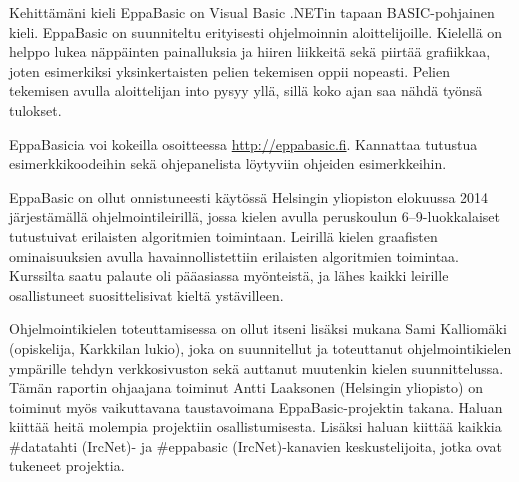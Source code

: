 Kehittämäni kieli EppaBasic
on Visual Basic .NETin tapaan
BASIC-pohjainen kieli.
EppaBasic on suunniteltu
erityisesti ohjelmoinnin aloittelijoille.
Kielellä on helppo lukea
näppäinten painalluksia
ja hiiren liikkeitä
sekä piirtää grafiikkaa,
joten esimerkiksi yksinkertaisten
pelien tekemisen oppii nopeasti.
Pelien tekemisen avulla aloittelijan into pysyy yllä,
sillä koko ajan saa nähdä työnsä tulokset.

EppaBasicia voi kokeilla osoitteessa
\url{http://eppabasic.fi}.
Kannattaa tutustua esimerkkikoodeihin
sekä ohjepanelista löytyviin
ohjeiden esimerkkeihin.

EppaBasic on ollut onnistuneesti käytössä
Helsingin yliopiston elokuussa 2014
järjestämällä ohjelmointileirillä,
jossa kielen avulla peruskoulun
6--9-luokkalaiset
tutustuivat erilaisten algoritmien toimintaan.
Leirillä kielen graafisten ominaisuuksien
avulla havainnollistettiin erilaisten
algoritmien toimintaa.
Kurssilta saatu palaute oli pääasiassa myönteistä,
ja lähes kaikki leirille osallistuneet
suosittelisivat kieltä ystävilleen.

Ohjelmointikielen toteuttamisessa on
ollut itseni lisäksi mukana
Sami Kalliomäki (opiskelija, Karkkilan lukio),
joka on suunnitellut ja toteuttanut
ohjelmointikielen ympärille tehdyn verkkosivuston
sekä auttanut muutenkin kielen suunnittelussa.
Tämän raportin ohjaajana toiminut
Antti Laaksonen (Helsingin yliopisto)
on toiminut myös vaikuttavana
taustavoimana EppaBasic-projektin takana.
Haluan kiittää heitä molempia
projektiin osallistumisesta.
Lisäksi haluan kiittää kaikkia
\#datatahti (IrcNet)- ja
\#eppabasic (IrcNet)-kanavien keskustelijoita,
jotka ovat tukeneet projektia.